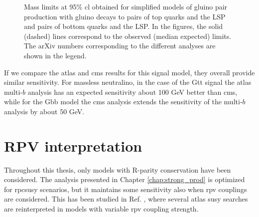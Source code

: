\begin{figure}[htbp]
	\centering 
	\caption{Mass limits at 95\% \gls{cl} obtained for simplified models of gluino pair production 
	with gluino decays to  pairs of top quarks and the LSP and 
	pairs of bottom quarks and the LSP. 
	In the figures, the solid (dashed) 
	lines correspond to the observed (median expected) limits. The arXiv numbers corresponding to the different analyses are shown in the legend.
	}
	\label{fig:limits_GbbGtt_comp}
\end{figure}

If we compare the \gls{atlas} and \gls{cms} results for this signal model, 
they overall provide similar sensitivity. 
For massless neutralino, 
in the case of the Gtt signal the \gls{atlas} multi-$b$ analysis has an expected sensitivity about 100 GeV better than \gls{cms}, 
while for the Gbb model the \gls{cms} \htmiss analysis extends the sensitivity of the multi-$b$ analysis by about 50 GeV.

\FloatBarrier

\section{RPV interpretation}
\label{sec:rpvrpc}

Throughout this thesis, only models with R-parity conservation have been considered. 
The analysis presented in Chapter \ref{chap:strong_prod} is optimized for 
\gls{rpcsusy} scenarios, but it maintains some sensitivity also when \gls{rpv} couplings are considered. 
This has been studied in Ref. \cite{ATLAS-CONF-2018-003}, where several \gls{atlas} \gls{susy} searches  
are reinterpreted in models with variable \gls{rpv} coupling strength.

